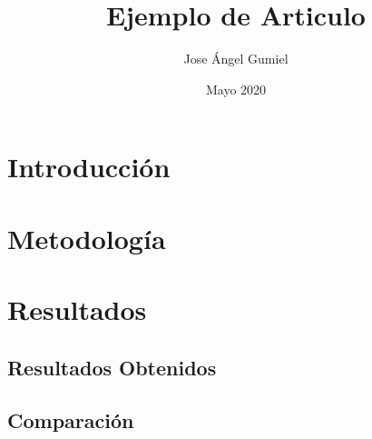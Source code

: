\documentclass{article}
\title{Ejemplo de Articulo}
\author{Jose Ángel Gumiel}
\date{Mayo 2020}
\begin{document}
\maketitle %
\section{Introducción}
\lipsum
\section{Metodología}
\lipsum
\section{Resultados}
\subsection{Resultados Obtenidos}
\lipsum
\subsection{Comparación}
\lipsum
\end{document}
